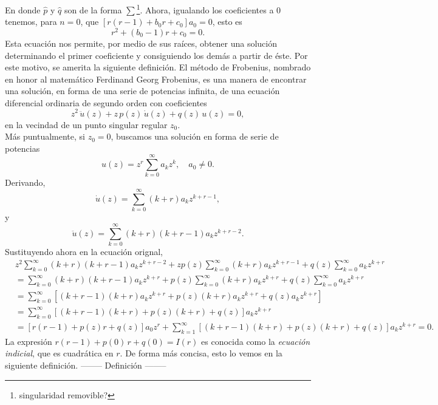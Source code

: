 \documentclass[main.tex]{subfiles}
\begin{document}
En donde $\hat{p}$ y $\hat{q}$ son de la forma $\sum$\footnote{singularidad removible?}. Ahora, igualando los coeficientes a 0 tenemos, para $n=0$, que $[r(r-1)+b_{0}r+c_{0}]a_{0}=0$, esto es
\[
  r^{2}+(b_{0}-1)r+c_{0}=0.
\]
Esta ecuación nos permite, por medio de sus raíces, obtener una solución determinando el primer coeficiente y consiguiendo los demás a partir de éste. Por este motivo, se amerita la siguiente definición.
El método de Frobenius, nombrado en honor al matemático Ferdinand Georg Frobenius, es una manera de encontrar una solución, en forma de una serie de potencias infinita, de una ecuación diferencial ordinaria de segundo orden con coeficientes
\[
  z^{2}\,\ddot{u}(z)+z\,p(z)\,\dot{u}(z)+q(z)\,u(z)=0,
\]
en la vecindad de un punto singular regular $z_{0}$.\\
\indent Más puntualmente, si $z_{0}=0$, buscamos una solución en forma de serie de potencias
\[
  u(z)=z^{r}\sum_{k=0}^{\infty}a_{k}z^{k},\quad a_{0}\neq0.
\]
Derivando,
\[
  \dot{u}(z)=\sum_{k=0}^{\infty}(k+r)a_{k}z^{k+r-1},
\]
y
\[
  \ddot{u}(z)=\sum_{k=0}^{\infty}(k+r)(k+r-1)a_{k}z^{k+r-2}.
\]
Sustituyendo ahora en la ecuación orignal,
\begin{align*}
  &z^{2}\sum_{k=0}^{\infty}(k+r)(k+r-1)a_{k}z^{k+r-2}+zp(z)\sum_{k=0}^{\infty}(k+r)a_{k}z^{k+r-1}+q(z)\sum_{k=0}^{\infty}a_{k}z^{k+r}\\
  &=\sum_{k=0}^{\infty}(k+r)(k+r-1)a_{k}z^{k+r}+p(z)\sum_{k=0}^{\infty}(k+r)a_{k}z^{k+r}+q(z)\sum_{k=0}^{\infty}a_{k}z^{k+r}\\
  &=\sum_{k=0}^{\infty}\left[(k+r-1)(k+r)a_{k}z^{k+r}+p(z)(k+r)a_{k}z^{k+r}+q(z)a_{k}z^{k+r}\right]\\
  &=\sum_{k=0}^{\infty}\left[(k+r-1)(k+r)+p(z)(k+r)+q(z)\right]a_{k}z^{k+r}\\
  &=[r(r-1)+p(z)r+q(z)]a_{0}z^{r}+\sum_{k=1}^{\infty}[(k+r-1)(k+r)+p(z)(k+r)+q(z)]a_{k}z^{k+r}=0.
\end{align*}
La expresión $r(r-1)+p(0)\,r+q(0)=I(r)$ es conocida como la \textit{ecuación indicial}, que es cuadrática en $r$. De forma más concisa, esto lo vemos en la siguiente definición.
-------- Definición --------%
\begin{def.}\label{d1.2} %
\end{def.}
\end{document}
